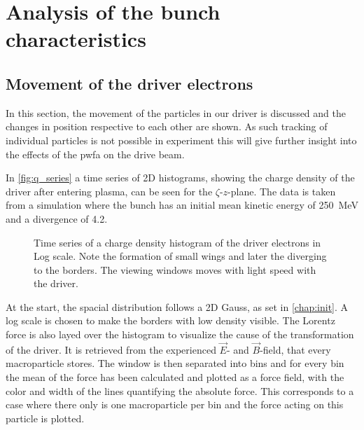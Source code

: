 \documentclass[bachelor_thesis]{subfiles}
\begin{document}
\chapter{Analysis of the bunch characteristics}
\section{Movement of the driver electrons}
In this section, the movement of the particles in our driver is discussed and the changes in position respective to each other are shown. As such tracking of individual particles is not possible in experiment
this will give further insight into the effects of the \gls{pwfa} on the drive beam.

In \autoref{fig:q_series} a time series of 2D histograms, showing the charge density of the driver after entering plasma, can be seen for the $\zeta$-$z$-plane. The data is taken from a simulation where the bunch has an initial mean kinetic energy of \qty{250}{\MeV} and a divergence of \qty{4.2}{\mrad}. 
\begin{figure}
	\centering
	\missingfigure{}
	\caption{Time series of a charge density histogram of the driver electrons in Log scale. Note the formation of small wings and later the diverging to the borders. The viewing windows moves with light speed with the driver.}
	\label{fig:q_series}
\end{figure}
At the start, the spacial distribution follows a 2D Gauss, as set in \autoref{chap:init}. A log scale is chosen to make the borders with low density visible. 
The Lorentz force is also layed over the histogram to visualize the cause of the transformation of the driver. It is retrieved from the experienced $\vec{E}$- and $\vec{B}$-field, that every macroparticle stores.
The window is then separated into bins and for every bin the mean of the force has been calculated and plotted as a force field, with the color and width of the lines quantifying the absolute force. 
This corresponds to a case where there only is one macroparticle per bin and the force acting on this particle is plotted.
\end{document}

